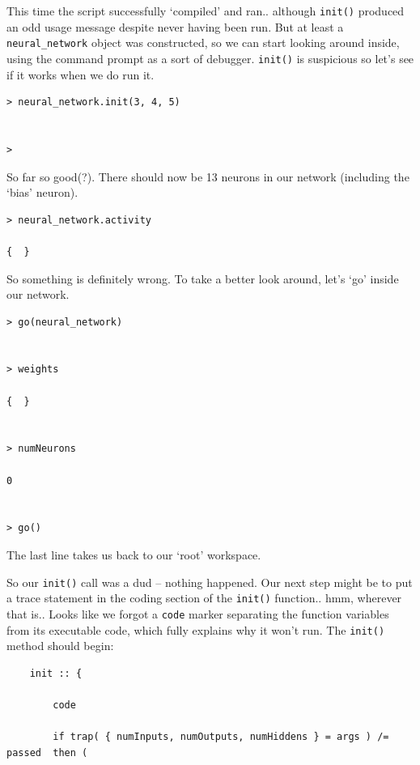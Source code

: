 \documentclass{article}
\newenvironment{code}{
       \begin{list}{}{
               \setlength{\leftmargin}{.4in}
               \setlength{\rightmargin}{0in}
               \setlength{\topsep}{.2in}
       }
       \small
       \item[] }
       { \end{list}   }
\begin{document}
This time the script successfully `compiled' and ran.. although \verb#init()# produced an odd usage message despite never having been run.  But at least a \verb#neural_network# object was constructed, so we can start looking around inside, using the command prompt as a sort of debugger.  \verb#init()# is suspicious so let's see if it works when we do run it.

\begin{code} \begin{verbatim}
> neural_network.init(3, 4, 5)


>
\end{verbatim} \end{code}

\noindent So far so good(?).  There should now be 13 neurons in our network (including the `bias' neuron).

\begin{code} \begin{verbatim}
> neural_network.activity

{  }
\end{verbatim} \end{code}

\noindent So something is definitely wrong.  To take a better look around, let's `go' inside our network.

\begin{code} \begin{verbatim}
> go(neural_network)


> weights

{  }


> numNeurons

0


> go()
\end{verbatim} \end{code}

\noindent The last line takes us back to our `root' workspace.

So our \verb#init()# call was a dud -- nothing happened.  Our next step might be to put a trace statement in the coding section of the \verb#init()# function.. hmm, wherever that is..  Looks like we forgot a \verb#code# marker separating the function variables from its executable code, which fully explains why it won't run.  The \verb#init()# method should begin:

\begin{code} \begin{verbatim}
    init :: {
        
        code
        
        if trap( { numInputs, numOutputs, numHiddens } = args ) /= passed  then (
\end{verbatim} \end{code}
\end{document}
